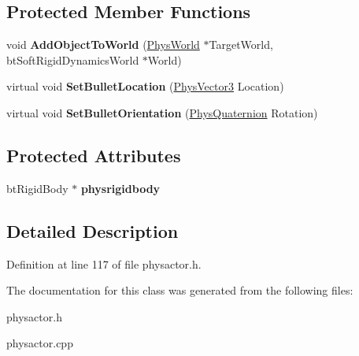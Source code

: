 \subsection*{Protected Member Functions}
\begin{DoxyCompactItemize}
\item 
\hypertarget{classActorDynRigid_a45c054918362b86d829398384e316ed8}{
void {\bfseries AddObjectToWorld} (\hyperlink{classPhysWorld}{PhysWorld} $\ast$TargetWorld, btSoftRigidDynamicsWorld $\ast$World)}
\label{d4/d0e/classActorDynRigid_a45c054918362b86d829398384e316ed8}

\item 
\hypertarget{classActorDynRigid_a3f0720ca18d04a1084207d474c3d7834}{
virtual void {\bfseries SetBulletLocation} (\hyperlink{classPhysVector3}{PhysVector3} Location)}
\label{d4/d0e/classActorDynRigid_a3f0720ca18d04a1084207d474c3d7834}

\item 
\hypertarget{classActorDynRigid_ae471894081ae956dd79844a2f14fb1d9}{
virtual void {\bfseries SetBulletOrientation} (\hyperlink{classPhysQuaternion}{PhysQuaternion} Rotation)}
\label{d4/d0e/classActorDynRigid_ae471894081ae956dd79844a2f14fb1d9}

\end{DoxyCompactItemize}
\subsection*{Protected Attributes}
\begin{DoxyCompactItemize}
\item 
\hypertarget{classActorDynRigid_a83a6cb758304431043c6bfa05b47ecb2}{
btRigidBody $\ast$ {\bfseries physrigidbody}}
\label{d4/d0e/classActorDynRigid_a83a6cb758304431043c6bfa05b47ecb2}

\end{DoxyCompactItemize}


\subsection{Detailed Description}


Definition at line 117 of file physactor.h.

The documentation for this class was generated from the following files:\begin{DoxyCompactItemize}
\item 
physactor.h\item 
physactor.cpp\end{DoxyCompactItemize}
